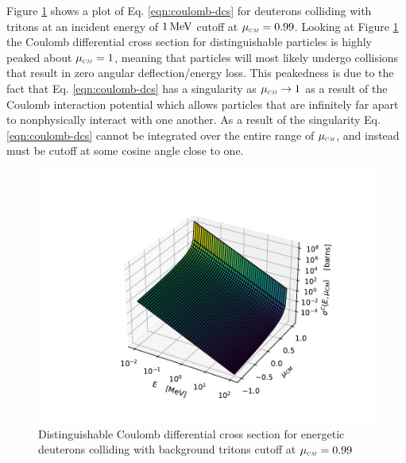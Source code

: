 Figure \ref{fig:sigma_c} shows a plot of Eq. \eqref{eqn:coulomb-dcs} for deuterons colliding with tritons at an incident energy of $1 \,\text{MeV}$ cutoff at $\mucm = 0.99$. Looking at Figure \ref{fig:sigma_c} the Coulomb differential cross section for distinguishable particles is highly peaked about $\mucm = 1$, meaning that particles will most likely undergo collisions that result in zero angular deflection/energy loss. This peakedness is due to the fact that Eq. \eqref{eqn:coulomb-dcs} has a singularity as $\mucm \rightarrow 1$ as a result of the Coulomb interaction potential which allows particles that are infinitely far apart to nonphysically interact with one another. As a result of the singularity Eq. \eqref{eqn:coulomb-dcs} cannot be integrated over the entire range of $\mucm$, and instead must be cutoff at some cosine angle close to one. 
\begin{figure}[!htb]
    \centering
    \includegraphics[scale=1.00]{../figures/interaction_physics/sigma-C.pdf}
    \caption{Distinguishable Coulomb differential cross section for energetic deuterons colliding with background tritons cutoff at $\mucm = 0.99$}
    \label{fig:sigma_c}
\end{figure}

